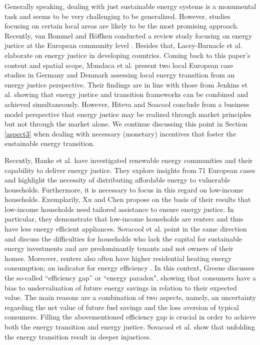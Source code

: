 Generally speaking, dealing with just sustainable energy systems is a monumental task and seems to be very challenging to be generalized. However, studies focusing on certain local areas are likely to be the most promising approach. Recently, van Bommel and Höffken conducted a review study focusing on energy justice at the European community level \cite{van2021energy}. Besides that, Lacey-Barnacle et al. \cite{lacey2020energy} elaborate on energy justice in developing countries. Coming back to this paper's content and spatial scope, Mundaca et al. \cite{mundaca2018successful} present two local European case studies in Germany and Denmark assessing local energy transition from an energy justice perspective. Their findings are in line with those from Jenkins et al. \cite{jenkins2018humanizing} showing that energy justice and transition frameworks can be combined and achieved simultaneously. However, Hiteva and Soacool \cite{hiteva2017harnessing} conclude from a business model perspective that energy justice may be realized through market principles but not through the market alone. We continue discussing this point in Section \ref{aspect3} when dealing with necessary (monetary) incentives that foster the sustainable energy transition. \vspace{0.5cm} 

Recently, Hanke et al. \cite{hanke2021renewable} have investigated renewable energy communities and their capability to deliver energy justice. They explore insights from 71 European cases and highlight the necessity of distributing affordable energy to vulnerable households. Furthermore, it is necessary to focus in this regard on low-income households. Exemplarily, Xu and Chen \cite{xu2019energy} propose on the basis of their results that low-income households need tailored assistance to ensure energy justice. In particular, they demonstrate that low-income households are renters and thus have less energy efficient appliances. Sovacool et al. \cite{sovacool2019temporality} point in the same direction and discuss the difficulties for households who lack the capital for sustainable energy investments and are predominantly tenants and not owners of their homes. Moreover, renters also often have higher residential heating energy consumption; an indicator for energy efficiency \cite{reames2016targeting}. In this context, Greene \cite{greene2011uncertainty} discusses the so-called “efficiency gap” or “energy paradox", showing that consumers have a bias to undervaluation of future energy savings in relation to their expected value. The main reasons are a combination of two aspects, namely, an uncertainty regarding the net value of future fuel savings and the loss aversion of typical consumers. Filling the abovementioned efficiency gap is crucial in order to achieve both the energy transition and energy justice. Sovacool et al. \cite{sovacool2019decarbonization} show that unfolding the energy transition result in deeper injustices.

